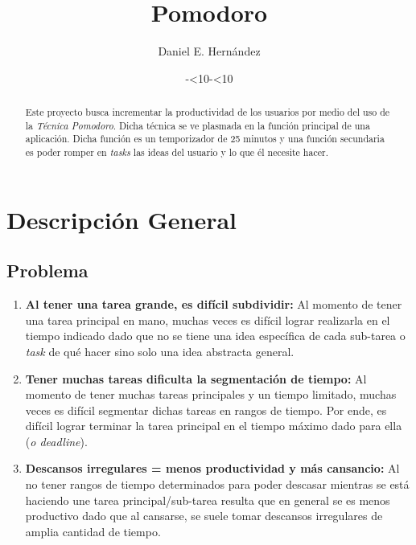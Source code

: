 \documentclass[]{article}
\title{\textbf{Pomodoro}}
\author{Daniel E. Hernández}
\date{\the\year-\ifnum\month<10\relax0\fi\the\month-\ifnum\day<10\relax0\fi\the\day}
\begin{document}
\maketitle

\begin{abstract}
Este proyecto busca incrementar la productividad de los usuarios por medio del uso de la \emph{Técnica Pomodoro}. Dicha técnica se ve plasmada en la función principal de una aplicación. Dicha función es un temporizador de 25 minutos y una función secundaria es poder romper en \textit{tasks} las ideas del usuario y lo que él necesite hacer. 
\end{abstract}

\section{Descripción General}
\subsection{Problema}
\begin{enumerate}
	\item \textbf{Al tener una tarea grande, es difícil subdividir:} Al momento de tener una tarea principal en mano, muchas veces es difícil lograr realizarla en el tiempo indicado dado que no se tiene una idea específica de cada sub-tarea o \textit{task} de qué hacer sino solo una idea abstracta general.
	
	\item \textbf{Tener muchas tareas dificulta la segmentación de tiempo:} Al momento de tener muchas tareas principales y un tiempo limitado, muchas veces es difícil segmentar dichas tareas en rangos de tiempo. Por ende, es difícil lograr terminar la tarea principal en el tiempo máximo dado para ella (\textit{o deadline}).

	\item \textbf{Descansos irregulares = menos productividad y más cansancio:} Al no tener rangos de tiempo determinados para poder descasar mientras se está haciendo une tarea principal/sub-tarea resulta que en general se es menos productivo dado que al cansarse, se suele tomar descansos irregulares de amplia cantidad de tiempo.
\end{enumerate}
\end{document}
